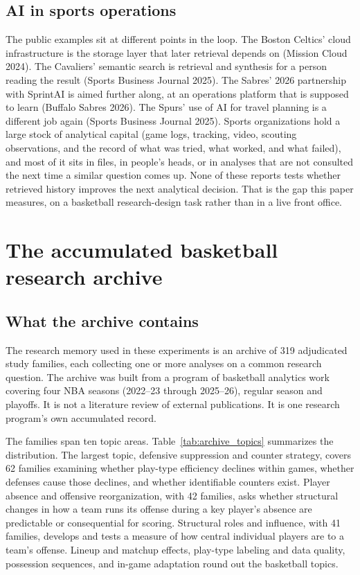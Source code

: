 \documentclass[11pt]{article}
\begin{document}
\subsection{AI in sports operations}

The public examples sit at different points in the loop. The Boston Celtics' cloud infrastructure is the storage layer that later retrieval depends on (Mission Cloud 2024). The Cavaliers' semantic search is retrieval and synthesis for a person reading the result (Sports Business Journal 2025). The Sabres' 2026 partnership with SprintAI is aimed further along, at an operations platform that is supposed to learn (Buffalo Sabres 2026). The Spurs' use of AI for travel planning is a different job again (Sports Business Journal 2025). Sports organizations hold a large stock of analytical capital (game logs, tracking, video, scouting observations, and the record of what was tried, what worked, and what failed), and most of it sits in files, in people's heads, or in analyses that are not consulted the next time a similar question comes up. None of these reports tests whether retrieved history improves the next analytical decision. That is the gap this paper measures, on a basketball research-design task rather than in a live front office.

\section{The accumulated basketball research archive}
\label{sec:archive_overview}

\subsection{What the archive contains}

The research memory used in these experiments is an archive of 319 adjudicated study families, each collecting one or more analyses on a common research question. The archive was built from a program of basketball analytics work covering four NBA seasons (2022--23 through 2025--26), regular season and playoffs. It is not a literature review of external publications. It is one research program's own accumulated record.

The families span ten topic areas. Table~\ref{tab:archive_topics} summarizes the distribution. The largest topic, defensive suppression and counter strategy, covers 62 families examining whether play-type efficiency declines within games, whether defenses cause those declines, and whether identifiable counters exist. Player absence and offensive reorganization, with 42 families, asks whether structural changes in how a team runs its offense during a key player's absence are predictable or consequential for scoring. Structural roles and influence, with 41 families, develops and tests a measure of how central individual players are to a team's offense. Lineup and matchup effects, play-type labeling and data quality, possession sequences, and in-game adaptation round out the basketball topics.
\end{document}

